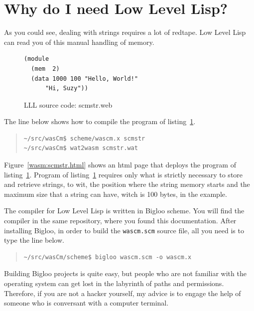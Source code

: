 \documentclass[a4paper,12pt]{book}
\begin{document}
\section{Why do I need Low Level Lisp?}
As you could see, dealing with strings requires
a lot of redtape. Low Level Lisp can read
you of this manual handling of memory.

\begin{figure}[!h]
\begin{verbatim}
(module
  (mem  2)
  (data 1000 100 "Hello, World!"
      "Hi, Suzy"))
\end{verbatim}
\caption{LLL source code: scmstr.web}
\label{wasm:scmstr.web}  
\end{figure}

The line below shows how to compile the
program of listing~\ref{wasm:scmstr.web}.
\begin{quote}
\begin{verbatim}
~/src/wasCm$ scheme/wascm.x scmstr
~/src/wasCm$ wat2wasm scmstr.wat
\end{verbatim}
\end{quote}

Figure~\ref{wasm:scmstr.html} shows an html page that
deploys the program of listing~\ref{wasm:scmstr.web}.
Program of listing~\ref{wasm:scmstr.web} requires
only what is strictly necessary to store and
retrieve strings, to wit, the position where the
string memory starts and the maximum size that
a string can have, witch is 100 bytes, in the example.

The compiler for Low Level Lisp is written in Bigloo
scheme. You will find the compiler in the same repository,
where you found this documentation. After installing
Bigloo, in order to build the \verb|wascm.scm| source
file, all you need is to type the line below.
\begin{quote}
\begin{verbatim}
~/src/wasCm/scheme$ bigloo wascm.scm -o wascm.x
\end{verbatim}
\end{quote}
Building Bigloo projects is quite easy, but people
who are not familiar with the operating system
can get lost in the labyrinth of paths and permissions.
Therefore, if you are not a hacker yourself, my
advice is to engage the help of someone who
is conversant with a computer terminal.
\end{document}
